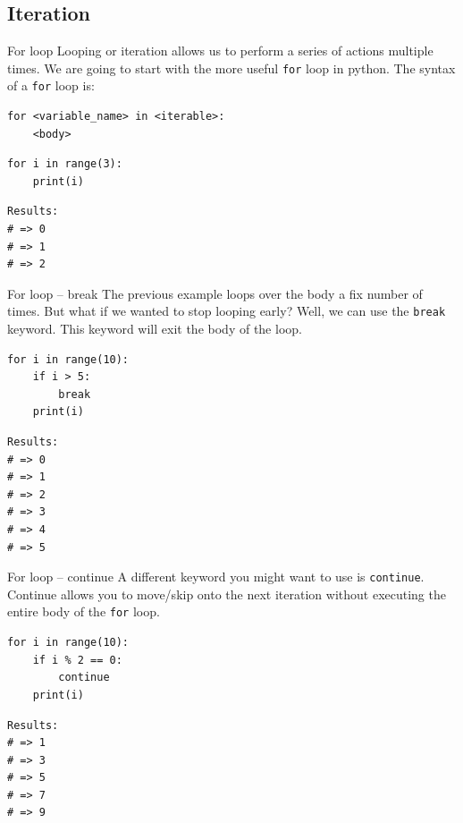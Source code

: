 \documentclass[10pt]{beamer}
\begin{document}
\subsection{Iteration}
\label{sec:orgf8edc12}
\begin{frame}[label={sec:orge525b5e},fragile]{For loop}
 Looping or iteration allows us to perform a series of actions multiple times. We are
going to start with the more useful \texttt{for} loop in python. The syntax of a \texttt{for} loop is:

\begin{verbatim}
for <variable_name> in <iterable>:
    <body>
\end{verbatim}

\begin{verbatim}
for i in range(3):
    print(i)
\end{verbatim}

\begin{verbatim}
Results: 
# => 0
# => 1
# => 2
\end{verbatim}
\end{frame}

\begin{frame}[label={sec:org6249ae8},fragile]{For loop -- break}
 The previous example loops over the body a fix number of times. But what if we wanted
to stop looping early? Well, we can use the \texttt{break} keyword. This keyword will exit the
body of the loop.

\begin{verbatim}
for i in range(10):
    if i > 5:
        break
    print(i)
\end{verbatim}

\begin{verbatim}
Results: 
# => 0
# => 1
# => 2
# => 3
# => 4
# => 5
\end{verbatim}
\end{frame}

\begin{frame}[label={sec:org252bfde},fragile]{For loop -- continue}
 A different keyword you might want to use is \texttt{continue}. Continue allows you to move/skip
onto the next iteration without executing the entire body of the \texttt{for} loop.

\begin{verbatim}
for i in range(10):
    if i % 2 == 0:
        continue
    print(i)
\end{verbatim}

\begin{verbatim}
Results: 
# => 1
# => 3
# => 5
# => 7
# => 9
\end{verbatim}
\end{frame}
\end{document}
